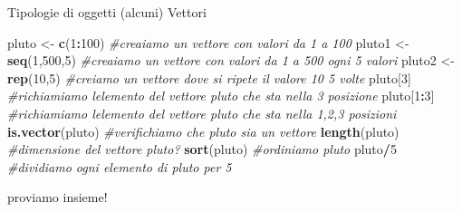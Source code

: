 \documentclass[
  ignorenonframetext,
]{beamer}
\newenvironment{Shaded}{\begin{snugshade}}{\end{snugshade}}
\newcommand{\CommentTok}[1]{\textcolor[rgb]{0.56,0.35,0.01}{\textit{#1}}}
\newcommand{\DecValTok}[1]{\textcolor[rgb]{0.00,0.00,0.81}{#1}}
\newcommand{\KeywordTok}[1]{\textcolor[rgb]{0.13,0.29,0.53}{\textbf{#1}}}
\newcommand{\NormalTok}[1]{#1}
\newcommand{\OperatorTok}[1]{\textcolor[rgb]{0.81,0.36,0.00}{\textbf{#1}}}
\newcommand{\StringTok}[1]{\textcolor[rgb]{0.31,0.60,0.02}{#1}}
\begin{document}
\begin{frame}[fragile]{Tipologie di oggetti (alcuni)}
\protect\hypertarget{tipologie-di-oggetti-alcuni}{}
Vettori

\begin{Shaded}
\begin{Highlighting}[]
\NormalTok{pluto \textless{}{-}}\StringTok{ }\KeywordTok{c}\NormalTok{(}\DecValTok{1}\OperatorTok{:}\DecValTok{100}\NormalTok{) }\CommentTok{\#creaiamo un vettore con valori da 1 a 100}
\NormalTok{pluto1 \textless{}{-}}\StringTok{ }\KeywordTok{seq}\NormalTok{(}\DecValTok{1}\NormalTok{,}\DecValTok{500}\NormalTok{,}\DecValTok{5}\NormalTok{) }\CommentTok{\#creaiamo un vettore con valori da 1 a 500 ogni  5 valori}
\NormalTok{pluto2 \textless{}{-}}\StringTok{ }\KeywordTok{rep}\NormalTok{(}\DecValTok{10}\NormalTok{,}\DecValTok{5}\NormalTok{) }\CommentTok{\#creiamo un vettore dove si ripete il valore 10 5 volte}
\NormalTok{pluto[}\DecValTok{3}\NormalTok{] }\CommentTok{\#richiamiamo l\textquotesingle{}elemento del vettore pluto che sta nella 3 posizione}
\NormalTok{pluto[}\DecValTok{1}\OperatorTok{:}\DecValTok{3}\NormalTok{] }\CommentTok{\#richiamiamo l\textquotesingle{}elemento del vettore pluto che sta nella 1,2,3 posizioni}
\KeywordTok{is.vector}\NormalTok{(pluto) }\CommentTok{\#verifichiamo che pluto sia un vettore}
\KeywordTok{length}\NormalTok{(pluto) }\CommentTok{\#dimensione del vettore pluto?}
\KeywordTok{sort}\NormalTok{(pluto) }\CommentTok{\#ordiniamo pluto}
\NormalTok{pluto}\OperatorTok{/}\DecValTok{5} \CommentTok{\#dividiamo ogni elemento di pluto per 5}
\end{Highlighting}
\end{Shaded}

proviamo insieme!
\end{frame}
\end{document}
